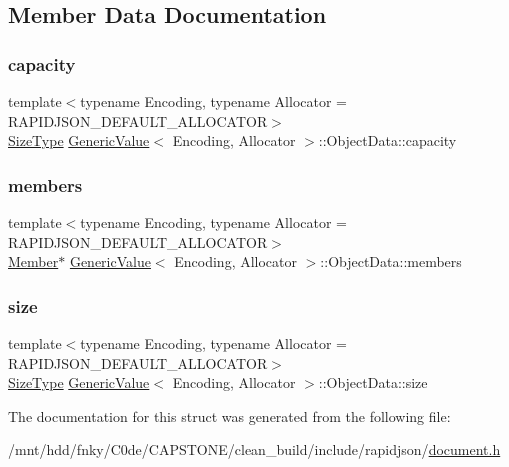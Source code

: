 \subsection{Member Data Documentation}
\mbox{\label{structGenericValue_1_1ObjectData_a22b8d8b01d52db71471f0d4c990cb93b}} 
\subsubsection{\texorpdfstring{capacity}{capacity}}
{\footnotesize\ttfamily template$<$typename Encoding, typename Allocator = R\+A\+P\+I\+D\+J\+S\+O\+N\+\_\+\+D\+E\+F\+A\+U\+L\+T\+\_\+\+A\+L\+L\+O\+C\+A\+T\+OR$>$ \\
\hyperlink{rapidjson_8h_a5ed6e6e67250fadbd041127e6386dcb5}{Size\+Type} \hyperlink{classGenericValue}{Generic\+Value}$<$ Encoding, Allocator $>$\+::Object\+Data\+::capacity}

\mbox{\label{structGenericValue_1_1ObjectData_a108be865f16e4c028f2354b1474a1ec8}} 
\subsubsection{\texorpdfstring{members}{members}}
{\footnotesize\ttfamily template$<$typename Encoding, typename Allocator = R\+A\+P\+I\+D\+J\+S\+O\+N\+\_\+\+D\+E\+F\+A\+U\+L\+T\+\_\+\+A\+L\+L\+O\+C\+A\+T\+OR$>$ \\
\hyperlink{classGenericValue_a7ccf27c44058b4c11c3efc6473afb886}{Member}$\ast$ \hyperlink{classGenericValue}{Generic\+Value}$<$ Encoding, Allocator $>$\+::Object\+Data\+::members}

\mbox{\label{structGenericValue_1_1ObjectData_a8aa09c430b245b9bb0745a1ab38201d5}} 
\subsubsection{\texorpdfstring{size}{size}}
{\footnotesize\ttfamily template$<$typename Encoding, typename Allocator = R\+A\+P\+I\+D\+J\+S\+O\+N\+\_\+\+D\+E\+F\+A\+U\+L\+T\+\_\+\+A\+L\+L\+O\+C\+A\+T\+OR$>$ \\
\hyperlink{rapidjson_8h_a5ed6e6e67250fadbd041127e6386dcb5}{Size\+Type} \hyperlink{classGenericValue}{Generic\+Value}$<$ Encoding, Allocator $>$\+::Object\+Data\+::size}



The documentation for this struct was generated from the following file\+:\begin{DoxyCompactItemize}
\item 
/mnt/hdd/fnky/\+C0de/\+C\+A\+P\+S\+T\+O\+N\+E/clean\+\_\+build/include/rapidjson/\hyperlink{document_8h}{document.\+h}\end{DoxyCompactItemize}
